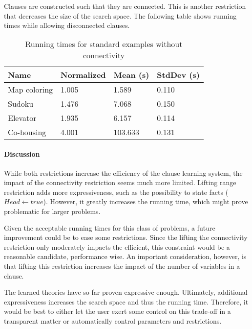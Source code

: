 \begin{experiment}
	Clauses are constructed such that they are connected.
	This is another restriction that decreases the size of the search space.
	The following table shows running times while allowing disconnected clauses.

	\begin{table}[!htp]
		\begin{tabularx}{\textwidth}{XXXX}
			\textbf{Name}	& \textbf{Normalized}	& \textbf{Mean (s)}	& \textbf{StdDev (s)} \\
			\toprule
			Map coloring 	& 1.005					& 1.589				& 0.110 \\
			Sudoku 			& 1.476					& 7.068				& 0.150 \\
			Elevator 		& 1.935					& 6.157 			& 0.114 \\
			Co-housing 		& 4.001					& 103.633			& 0.131
		\end{tabularx}
		\label{tbl:exp_speed_no_connect}
		\caption{Running times for standard examples without connectivity}
	\end{table}

\end{experiment}

\paragraph{Discussion}
While both restrictions increase the efficiency of the clause learning system, the impact of the connectivity restriction seems much more limited.
Lifting range restriction adds more expressiveness, such as the possibility to state facts ($Head \leftarrow true$).
However, it greatly increases the running time, which might prove problematic for larger problems.

Given the acceptable running times for this class of problems, a future improvement could be to ease some restrictions.
Since the lifting the connectivity restriction only moderately impacts the efficient, this constraint would be a reasonable candidate, performance wise.
An important consideration, however, is that lifting this restriction increases the impact of the number of variables in a clause.

The learned theories have so far proven expressive enough.
Ultimately, additional expressiveness increases the search space and thus the running time.
Therefore, it would be best to either let the user exert some control on this trade-off in a transparent matter or automatically control parameters and restrictions.

